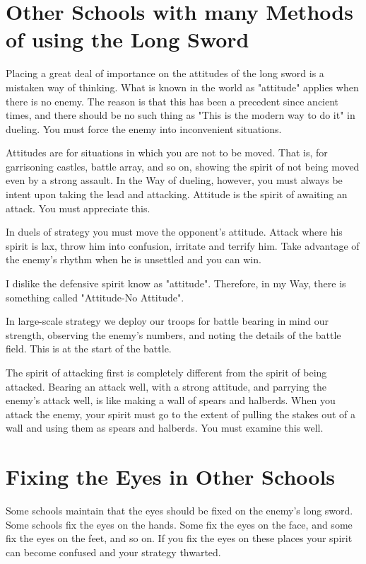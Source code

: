 \documentclass[12pt]{report}
\begin{document}
\section*{Other Schools with many Methods of using the Long Sword}
Placing a great deal of importance on the attitudes of the long sword is a mistaken way of thinking. What is known in the world as "attitude" applies when there is no enemy. The reason is that this has been a precedent since ancient times, and there should be no such thing as "This is the modern way to do it" in dueling. You must force the enemy into inconvenient situations.

Attitudes are for situations in which you are not to be moved. That is, for garrisoning castles, battle array, and so on, showing the spirit of not being moved even by a strong assault. In the Way of dueling, however, you must always be intent upon taking the lead and attacking. Attitude is the spirit of awaiting an attack. You must appreciate this.

In duels of strategy you must move the opponent's attitude. Attack where his spirit is lax, throw him into confusion, irritate and terrify him. Take advantage of the enemy's rhythm when he is unsettled and you can win.

I dislike the defensive spirit know as "attitude". Therefore, in my Way, there is something called "Attitude-No Attitude".

In large-scale strategy we deploy our troops for battle bearing in mind our strength, observing the enemy's numbers, and noting the details of the battle field. This is at the start of the battle.

The spirit of attacking first is completely different from the spirit of being attacked. Bearing an attack well, with a strong attitude, and parrying the enemy's attack well, is like making a wall of spears and halberds. When you attack the enemy, your spirit must go to the extent of pulling the stakes out of a wall and using them as spears and halberds. You must examine this well.
\section*{Fixing the Eyes in Other Schools}
Some schools maintain that the eyes should be fixed on the enemy's long sword. Some schools fix the eyes on the hands. Some fix the eyes on the face, and some fix the eyes on the feet, and so on. If you fix the eyes on these places your spirit can become confused and your strategy thwarted.
\end{document}
